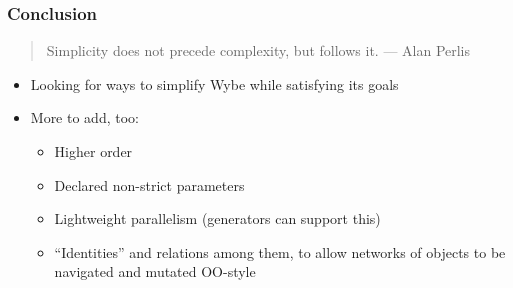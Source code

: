 \documentclass[12pt]{beamer}
\begin{document}
\begin{frame}
\frametitle{Conclusion}
\begin{quotation}
\noindent
Simplicity does not precede complexity, but follows it.
\hspace*{3em}--- Alan Perlis
\end{quotation}
\vspace{3ex}
\begin{itemize}
\item Looking for ways to simplify Wybe while satisfying its goals
\item More to add, too:
  \begin{itemize}
  \item Higher order
  \item Declared non-strict parameters
  \item Lightweight parallelism (generators can support this)
  \item ``Identities'' and relations among them, to allow
    networks of objects to be navigated and mutated OO-style
  \end{itemize}

\end{itemize}
\end{frame}


\end{document}
